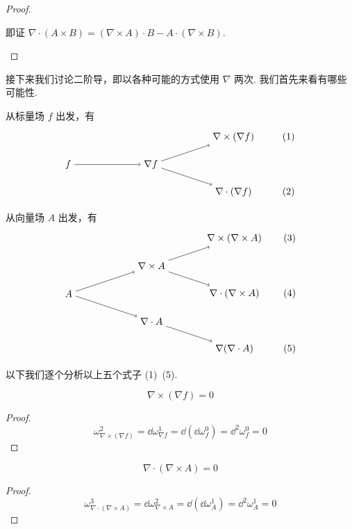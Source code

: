 \begin{proof}
\begin{enumerate}
        即证 $\nabla\cdot(A\times B)=(\nabla\times A)\cdot B-A\cdot(\nabla\times B)$.
    \end{enumerate}
\end{proof}

接下来我们讨论二阶导，即以各种可能的方式使用 $\nabla$ 两次. 我们首先来看有哪些可能性.

从标量场 $f$ 出发，有
$$
\begin{tikzpicture}
    \node[] (a) at (0,0)  {$f$};
    \node[] (b) at (3,0)  {$\nabla f$};
    \node[] (c) at (6,1)  {$\nabla\times(\nabla f)$};
    \node[] (d) at (6,-1) {$\nabla\cdot(\nabla f)$};
    \node[] ()  at (8,1)  {(1)};
    \node[] ()  at (8,-1) {(2)};

    \path[->] (a) edge node {} (b)
              (b) edge node {} (c)
                  edge node {} (d);
\end{tikzpicture}
$$

从向量场 $A$ 出发，有
$$
\begin{tikzpicture}
    \node[] (a) at (0,0)  {$A$};
    \node[] (b) at (3,1)  {$\nabla\times A$};
    \node[] (c) at (3,-1) {$\nabla\cdot A$};
    \node[] (d) at (6,2)  {$\nabla\times(\nabla\times A)$};
    \node[] (e) at (6,0)  {$\nabla\cdot(\nabla\times A)$};
    \node[] (f) at (6,-2) {$\nabla(\nabla\cdot A)$};
    \node[] ()  at (8,2)  {(3)};
    \node[] ()  at (8,0)  {(4)};
    \node[] ()  at (8,-2) {(5)};
    
    \path[->] (a) edge node {} (b)
                  edge node {} (c)
              (b) edge node {} (d)
                  edge node {} (e)
              (c) edge node {} (f);
\end{tikzpicture}
$$

以下我们逐个分析以上五个式子 (1)~(5).

\begin{property}[式 (1)]
$$
\nabla\times(\nabla f)=0
$$
\end{property}
\begin{proof}
$$
\omega_{\nabla\times(\nabla f)}^2=\dd\omega_{\nabla f}^1=\dd(\dd\omega_f^0)=\dd^2\omega_f^0=0
$$
\end{proof}

\begin{property}[式 (4)]
$$
\nabla\cdot(\nabla\times A)=0
$$
\end{property}
\begin{proof}
$$
\omega_{\nabla\cdot(\nabla\times A)}^3=\dd\omega_{\nabla\times A}^2=\dd(\dd\omega_A^1)=\dd^2\omega_A^1=0
$$
\end{proof}

